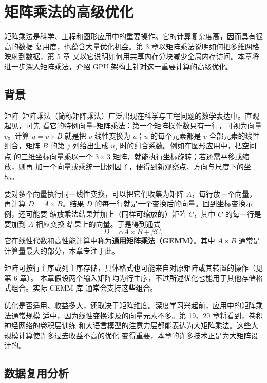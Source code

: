 \chapter{矩阵乘法的高级优化}
\label{chap:advanced-matrix-multiplication}
\chaptercontents

\setcounter{footnote}{0}

矩阵乘法是科学、工程和图形应用中的重要操作。它的计算复杂度高，因而具有很高的数据
复用度，也蕴含大量优化机会。第 3 章以矩阵乘法说明如何把多维网格映射到数据，第 5 章
又以它说明如何用共享内存分块减少全局内存访问。本章将进一步深入矩阵乘法，介绍 GPU
架构上针对这一重要计算的高级优化。

\section{背景}
\label{sec:advanced-mm-background}

矩阵--矩阵乘法（简称矩阵乘法）广泛出现在科学与工程问题的数学表达中。直观起见，可先
看它的特例向量--矩阵乘法：第一个矩阵操作数只有一行，可视为向量 $v$。计算
$u=v\times B$ 就是把 $v$ 线性变换为 $u$；$u$ 的每个元素都是 $v$ 全部元素的线性
组合，矩阵 $B$ 的第 $j$ 列给出生成 $u_j$ 时的组合系数。例如在图形应用中，把空间点
的三维坐标向量乘以一个 $3\times3$ 矩阵，就能执行坐标旋转；若还需平移或缩放，则再
加一个向量或乘统一比例因子，便得到新观察点、方向与尺度下的坐标。

要对多个向量执行同一线性变换，可以把它们收集为矩阵 $A$，每行放一个向量，再计算
$D=A\times B$。结果 $D$ 的每一行就是一个变换后的向量。回到坐标变换示例，还可能要
缩放乘法结果并加上（同样可缩放的）矩阵 $C$，其中 $C$ 的每一行是要加到 $A$ 相应变换
结果上的向量。于是得到通式
\[
  D=\alpha A\times B+\beta C,
\]
它在线性代数和高性能计算中称为\textbf{通用矩阵乘法（GEMM）}。其中
$A\times B$ 通常是计算量最大的部分，本章专注于此。

矩阵可按行主序或列主序存储，具体格式也可能来自对原矩阵或其转置的操作（见第 6 章）。
本章假设两个输入矩阵均为行主序，不过所述优化也能用于其他存储格式组合。实际 GEMM 库
通常会支持这些组合。

优化是否适用、收益多大，还取决于矩阵维度。深度学习兴起前，应用中的矩阵乘法通常规模
适中，因为线性变换涉及的向量元素不多。第 19、20 章将看到，卷积神经网络的卷积层训练
和大语言模型的注意力层都能表达为大矩阵乘法。这些大规模计算使许多过去收益不高的优化
变得重要，本章的许多技术正是为大矩阵设计的。

\section{数据复用分析}
\label{sec:mm-data-reuse}

